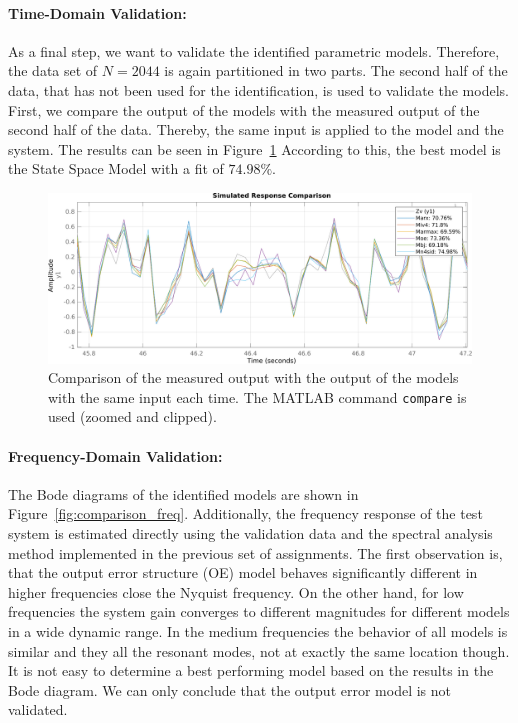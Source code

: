 \paragraph{Time-Domain Validation:}
As a final step, we want to validate the identified parametric models. Therefore, the data set of $N = 2044$ is again partitioned in two parts. 
The second half of the data, that has not been used for the identification, is used to validate the models. 
First, we compare the output of the models with the measured output of the second half of the data.  
Thereby, the same input is applied to the model and the system. 
The results can be seen in Figure~\ref{fig:comparison}
According to this, the best model is the State Space Model with a fit of $74.98 \% $.

\begin{figure}[h]
	\centering
	\includegraphics[width=\textwidth]{figures/time_domain_compare.pdf}
 	\caption{Comparison of the measured output with the output of the models with the same input each time. The MATLAB command \texttt{compare} is used (zoomed and clipped).}
 	\label{fig:comparison}
\end{figure}

\paragraph{Frequency-Domain Validation: } The Bode diagrams of the identified models are shown in Figure~\ref{fig:comparison_freq}.
Additionally, the frequency response of the test system is estimated directly using the validation data and the spectral analysis method implemented in the previous set of assignments.
The first observation is, that the output error structure (OE) model behaves significantly different in higher frequencies close the Nyquist frequency.
On the other hand, for low frequencies the system gain converges to different magnitudes for different models in a wide dynamic range.
In the medium frequencies the behavior of all models is similar and they all the resonant modes, not at exactly the same location though.
It is not easy to determine a best performing model based on the results in the Bode diagram.
We can only conclude that the output error model is not validated.


